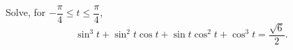 Solve, for $-\dfrac{\pi}{4}\le t\le\dfrac{\pi}{4}$,
\[
\sin^3t+\sin^2t\cos t+\sin t\cos^2t+\cos^3t=\dfrac{\sqrt6}{2}.
\]
